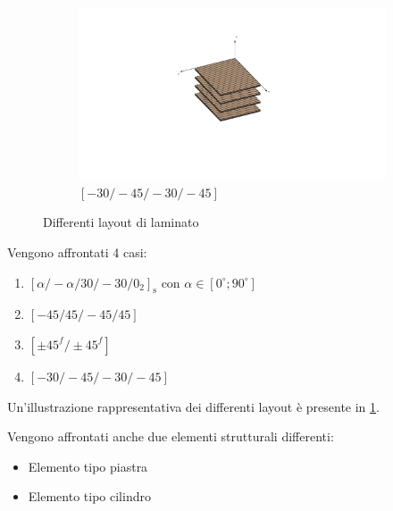 \documentclass[a4paper,num-refs]{oup-contemporary}
\begin{document}
\begin{figure}[bt!]
\begin{subfigure}[t]{0.24\textwidth}
	\end{subfigure}
	\hfill
	\begin{subfigure}[t]{0.24\textwidth}
		\centering
		\includegraphics[width=\textwidth]{struct4.pdf}
		\caption{$[-30 /-45 /-30 /-45]$}
		
	\end{subfigure}
	\hfill
	\caption{Differenti layout di laminato }
	\label{fig:laminates}
\end{figure}

Vengono affrontati 4 casi:

\begin{enumerate}[label=(\alph*)]
	\item $[\alpha /-\alpha / 30 /-30 / 0_{2}]_{\mathrm{s}}$ con $\alpha\in\left[0^\circ;90^\circ\right]$
	\item $[-45 / 45 /-45 / 45]$
	\item $[\pm 45^{f} / \pm 45^{f}]$
	\item $[-30 /-45 /-30 /-45]$
\end{enumerate}

Un'illustrazione rappresentativa dei differenti layout è presente in \cref{fig:laminates}.

Vengono affrontati anche due elementi strutturali differenti:
\begin{itemize}
\item Elemento tipo piastra
\item Elemento tipo cilindro
\end{itemize}
\end{document}
